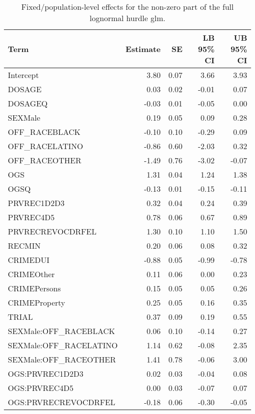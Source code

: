 \documentclass[
  letterpaper,
  DIV=11,
  numbers=noendperiod]{scrartcl}
\begin{document}
\hypertarget{tbl-brms-hurdle-model-summary-2}{}
\begin{table}
\caption{\label{tbl-brms-hurdle-model-summary-2}Fixed/population-level effects for the non-zero part of the full
lognormal hurdle glm. }\tabularnewline

\centering
\begin{tabular}{lrrrr}
\toprule
Term & Estimate & SE & LB 95\% CI & UB 95\% CI\\
\midrule
Intercept & 3.80 & 0.07 & 3.66 & 3.93\\
DOSAGE & 0.03 & 0.02 & -0.01 & 0.07\\
DOSAGEQ & -0.03 & 0.01 & -0.05 & 0.00\\
SEXMale & 0.19 & 0.05 & 0.09 & 0.28\\
OFF\_RACEBLACK & -0.10 & 0.10 & -0.29 & 0.09\\
\addlinespace
OFF\_RACELATINO & -0.86 & 0.60 & -2.03 & 0.32\\
OFF\_RACEOTHER & -1.49 & 0.76 & -3.02 & -0.07\\
OGS & 1.31 & 0.04 & 1.24 & 1.38\\
OGSQ & -0.13 & 0.01 & -0.15 & -0.11\\
PRVREC1D2D3 & 0.32 & 0.04 & 0.24 & 0.39\\
\addlinespace
PRVREC4D5 & 0.78 & 0.06 & 0.67 & 0.89\\
PRVRECREVOCDRFEL & 1.30 & 0.10 & 1.10 & 1.50\\
RECMIN & 0.20 & 0.06 & 0.08 & 0.32\\
CRIMEDUI & -0.88 & 0.05 & -0.99 & -0.78\\
CRIMEOther & 0.11 & 0.06 & 0.00 & 0.23\\
\addlinespace
CRIMEPersons & 0.15 & 0.05 & 0.05 & 0.26\\
CRIMEProperty & 0.25 & 0.05 & 0.16 & 0.35\\
TRIAL & 0.37 & 0.09 & 0.19 & 0.55\\
SEXMale:OFF\_RACEBLACK & 0.06 & 0.10 & -0.14 & 0.27\\
SEXMale:OFF\_RACELATINO & 1.14 & 0.62 & -0.08 & 2.35\\
\addlinespace
SEXMale:OFF\_RACEOTHER & 1.41 & 0.78 & -0.06 & 3.00\\
OGS:PRVREC1D2D3 & 0.02 & 0.03 & -0.04 & 0.08\\
OGS:PRVREC4D5 & 0.00 & 0.03 & -0.07 & 0.07\\
OGS:PRVRECREVOCDRFEL & -0.18 & 0.06 & -0.30 & -0.05\\
\bottomrule
\end{tabular}
\end{table}
\end{document}
